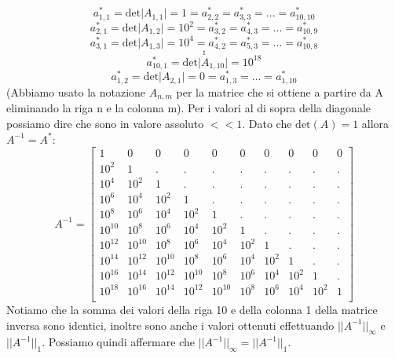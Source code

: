 \begin{flushleft}
\newpage
\[
a^*_{1,1} = \text{det}\big|A_{1,1}\big| = 1 = a^*_{2,2} = a^*_{3,3} = ... = a^*_{10,10}
\]
\[
a^*_{2,1} = \text{det}\big|A_{1,2}\big| = 10^2 = a^*_{3,2} = a^*_{4,3} = ... = a^*_{10,9}
\]
\[
a^*_{3,1} = \text{det}\big|A_{1,3}\big| = 10^4 = a^*_{4,2} = a^*_{5,3} = ... = a^*_{10,8}
\]
\[
.
\]
\[
.
\]
\[
.
\]
\[
a^*_{10,1} = \text{det}\big|A_{1,10}\big| = 10^{18} 
\]
\[
a^*_{1,2} = \text{det}\big|A_{2,1}\big| = 0 = a^*_{1,3} = ... = a^*_{1,10}
\]
(Abbiamo usato la notazione $A_{n,m}$ per la matrice che si ottiene a partire da A eliminando la riga n e la colonna m). Per i valori al di sopra della diagonale possiamo dire che sono in valore assoluto $<<1$. Dato che $\text{det}(A)=1$ allora $A^{-1} = A^*$:
\[
A^{-1}=\begin{bmatrix}
1&0&0&0&0&0&0&0&0&0\\
10^2&1&.&.&.&.&.&.&.&.\\
10^4&10^2&1&.&.&.&.&.&.&.\\
10^6&10^4&10^2&1&.&.&.&.&.&.\\
10^8&10^6&10^4&10^2&1&.&.&.&.&.\\
10^{10}&10^8&10^6&10^4&10^2&1&.&.&.&.\\
10^{12}&10^{10}&10^8&10^6&10^4&10^2&1&.&.&.\\
10^{14}&10^{12}&10^{10}&10^8&10^6&10^4&10^2&1&.&.\\
10^{16}&10^{14}&10^{12}&10^{10}&10^8&10^6&10^4&10^2&1&.\\
10^{18}&10^{16}&10^{14}&10^{12}&10^{10}&10^8&10^6&10^4&10^2&1\\
\end{bmatrix}
\]
Notiamo che la somma dei valori della riga 10 e della colonna 1 della matrice inversa sono identici, inoltre sono anche i valori ottenuti effettuando $\Big|\Big|A^{-1}\Big|\Big|_{\infty}$ e $\Big|\Big|A^{-1}\Big|\Big|_{1}$. Possiamo quindi affermare che $\Big|\Big|A^{-1}\Big|\Big|_{\infty} = \Big|\Big|A^{-1}\Big|\Big|_{1}$.
\end{flushleft}